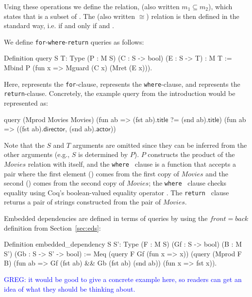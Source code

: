 \documentclass[preprint]{sigplanconf}
\newcommand{\WHERE}{{\tt where} \ }
\newcommand{\RETURN}{{\tt return} \ }
\newcommand{\greg}[1]{\textcolor{blue}{GREG: #1}}
\newcommand{\relation}[1]{\ensuremath{\mathit{#1}}\xspace}
\begin{document}
Using these operations we define the  relation,  (also written $m_1 \subseteq m_2$), which states that  is a subset of .  The  (also written $\cong$) relation is then defined in the standard way, i.e.  if and only if  and .  

We  define {\tt for}-{\tt where}-{\tt return} queries as follows:
\begin{coq}
Definition query {S T: Type}
  (P : M S) (C : S -> bool) (E : S -> T) : M T :=
  Mbind P (fun x => Mguard (C x) (Mret (E x))).
\end{coq}
Here,  represents the {\tt for}-clause,  represents the {\tt where}-clause, and  represents the {\tt return}-clause.
Concretely, the example query from the introduction would be represented as:
\begin{coq}
query (Mprod Movies Movies)
      (fun ab => (fst ab).$\textsf{title}$ ?= (snd ab).$\textsf{title}$)
      (fun ab => ((fst ab).$\textsf{director}$, (snd ab).$\textsf{actor}$))
\end{coq}
Note that the $S$ and $T$ arguments are omitted since they can be inferred from the other arguments (e.g., $S$ is determined by $P$).  $P$ constructs the product of the \relation{Movies} relation with itself, and the \WHERE clause is a function that accepts a pair where the first element () comes from the first copy of \relation{Movies} and the second () comes from the second copy of \relation{Movies}; the \WHERE clause checks equality using Coq's boolean-valued equality operator .  The \RETURN clause returns a pair of strings constructed from the pair of \relation{Movies}.

Embedded dependencies are defined in terms of queries by using the $front = back$ definition from Section~\ref{sec:eds}:
\\
\begin{coq}
Definition embedded_dependency {S S': Type}
  (F : M S) (Gf : S -> bool) (B : M S') (Gb : S -> S' -> bool)
:= Meq (query F Gf (fun x => x))
       (query (Mprod F B)
              (fun ab => Gf (fst ab) && Gb (fst ab) (snd ab))
              (fun x => fst x)).
\end{coq}

\greg{it would be good to give a concrete example here, so readers can get an idea of what they should be thinking about.}
\end{document}
